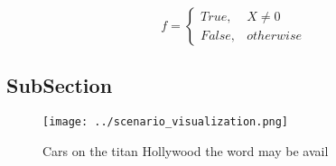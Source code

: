 \documentclass[a4paper]{article}
\begin{document}
\begin{equation}   f =
\begin{cases} True, & X \neq 0\\
False, & otherwise
\end{cases}
\end{equation}

\subsection{SubSection}

\begin{figure}
\centering
\texttt{[image: ../scenario\_visualization.png]}
\caption{Cars on the titan Hollywood the word may be avail
}
\end{figure}
 
\end{document}
